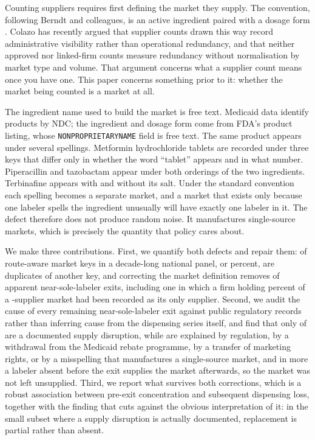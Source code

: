 \documentclass[pdflatex,sn-vancouver-num,Numbered]{sn-jnl}
\begin{document}
Counting suppliers requires first defining the market they supply. The convention, following
Berndt and colleagues, is an active ingredient paired with a dosage form \cite{berndt2017}.
Colazo \cite{colazo2026} has recently argued that supplier counts drawn this way record
administrative visibility rather than operational redundancy, and that neither approved nor
linked-firm counts measure redundancy without normalisation by market type and volume. That
argument concerns what a supplier count means once you have one. This paper concerns something
prior to it: whether the market being counted is a market at all.

The ingredient name used to build the market is free text. Medicaid data identify products by
NDC; the ingredient and dosage form come from FDA's product listing, whose
\texttt{NONPROPRIETARYNAME} field is free text. The same product
appears under several spellings. Metformin hydrochloride tablets are recorded under three keys
that differ only in whether the word ``tablet'' appears and in what number. Piperacillin and
tazobactam appear under both orderings of the two ingredients. Terbinafine appears with and
without its salt. Under the standard convention each spelling becomes a separate market, and a
market that exists only because one labeler spells the ingredient unusually will have exactly one
labeler in it. The defect therefore does not produce random noise. It manufactures single-source
markets, which is precisely the quantity that policy cares about.

We make three contributions. First, we quantify both defects and repair them: \nKeysAbsorbed of
\nRawKeys route-aware market keys in a decade-long national panel, or \nDupKeyPct percent, are
duplicates of another key, and
correcting the market definition removes \nReclassSoleW of \nRawSoleW apparent near-sole-labeler exits, including one in which a firm holding \nPregShare percent of
a \nPregLabelersW-supplier market had been recorded as its only supplier. Second, we audit the cause of
every remaining near-sole-labeler exit against public regulatory records rather than inferring cause
from the dispensing series itself, and find that only \nCauseSupplyW of \nCauseTotal are a
documented supply disruption, while \nCauseExplainedW are explained by regulation, by a
withdrawal from the Medicaid rebate programme, by a transfer of marketing rights, or by a
misspelling that manufactures a single-source market, and in \nCauseContinuedW more a labeler
absent before the exit supplies the market afterwards, so the market was not left unsupplied. Third, we report what survives both corrections, which is a robust association between
pre-exit concentration and subsequent dispensing loss, together with the finding that cuts against
the obvious interpretation of it: in the small subset where a supply disruption is actually
documented, replacement is partial rather than absent.
\end{document}
